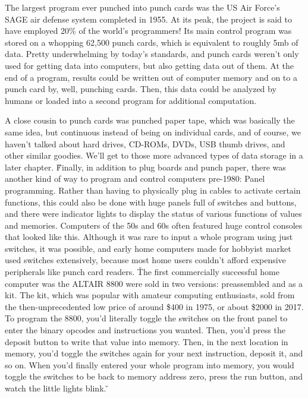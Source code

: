 
\be
The largest program ever punched into punch cards was the US Air Force's SAGE air defense system completed in 1955.
At its peak, the project is said to have employed 20\% of the world's programmers! Its main control program was
stored on a whopping 62,500 punch cards, which is equivalent to roughly 5mb of data. Pretty underwhelming by today's
standards, and punch cards weren't only used for getting data into computers, but also getting data out of them. At
the end of a program, results could be written out of computer memory and on to a punch card by, well, punching cards.
Then, this data could be analyzed by humans or loaded into a second program for additional computation.
\ee

A close cousin to punch cards was punched paper tape, which was basically the same idea, but continuous instead of
being on individual cards, and of course, we haven't talked about hard drives, CD-ROMs, DVDs, USB thumb drives, and
other similar goodies. We'll get to those more advanced types of data storage in a later chapter. \v

Finally, in addition to plug boards and punch paper, there was another kind of way to program and control computers
pre-1980: Panel programming. Rather than having to physically plug in cables to activate certain functions, this
could also be done with huge panels full of switches and buttons, and there were indicator lights to display the
status of various functions of values and memories. Computers of the 50s and 60s often featured huge control consoles
that looked like this. Although it was rare to input a whole program using just switches, it was possible, and early
home computers made for hobbyist market used switches extensively, because most home users couldn't afford expensive
peripherals like punch card readers. \v

The first commercially successful home computer was the ALTAIR 8800 were sold in two versions: preassembled and as a
kit. The kit, which was popular with amateur computing enthusiasts, sold from the then-unprecedented low price of
around \$400 in 1975, or about \$2000 in 2017. To program the 8800, you'd literally toggle the switches on the front
panel to enter the binary opcodes and instructions you wanted. Then, you'd press the deposit button to write that
value into memory. Then, in the next location in memory, you'd toggle the switches again for your next instruction,
deposit it, and so on. When you'd finally entered your whole program into memory, you would toggle the switches to be
back to memory address zero, press the run button, and watch the little lights blink. \v

